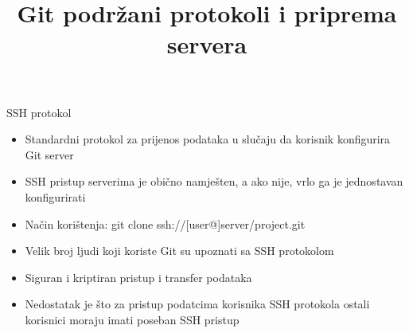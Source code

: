 \documentclass[10pt]{beamer}
\title{Git podržani protokoli i priprema servera}
\begin{document}
	\begin{frame}
		\maketitle	

	\end{frame}

	\begin{frame}{SSH protokol}
		
		\begin{itemize}
			

			\item Standardni protokol za prijenos podataka u slučaju da korisnik konfigurira Git server
			\item SSH pristup serverima je obično namješten, a ako nije, vrlo ga je jednostavan konfigurirati
			\item Način korištenja:    git clone ssh://[user@]server/project.git 
			\item Velik broj ljudi koji koriste Git su upoznati sa SSH protokolom 
			\item Siguran i kriptiran pristup i transfer podataka
			\item Nedostatak je što za pristup podatcima korisnika SSH protokola ostali korisnici moraju imati poseban SSH pristup  
		
		\end{itemize}		



	\end{frame}
	
\end{document}
